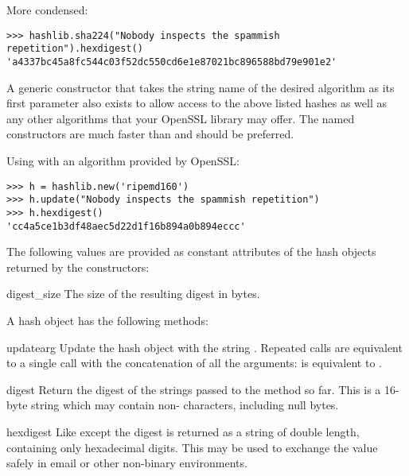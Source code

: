 More condensed:

\begin{verbatim}
>>> hashlib.sha224("Nobody inspects the spammish repetition").hexdigest()
'a4337bc45a8fc544c03f52dc550cd6e1e87021bc896588bd79e901e2'
\end{verbatim}

A generic  constructor that takes the string name of the
desired algorithm as its first parameter also exists to allow access to the
above listed hashes as well as any other algorithms that your OpenSSL library
may offer.  The named constructors are much faster than  and
should be preferred.

Using  with an algorithm provided by OpenSSL:

\begin{verbatim}
>>> h = hashlib.new('ripemd160')
>>> h.update("Nobody inspects the spammish repetition")
>>> h.hexdigest()
'cc4a5ce1b3df48aec5d22d1f16b894a0b894eccc'
\end{verbatim}

The following values are provided as constant attributes of the hash objects
returned by the constructors:

\begin{datadesc}{digest_size}
  The size of the resulting digest in bytes.
\end{datadesc}

A hash object has the following methods:

\begin{methoddesc}[hash]{update}{arg}
Update the hash object with the string .  Repeated calls are
equivalent to a single call with the concatenation of all the
arguments:  is equivalent to
.
\end{methoddesc}

\begin{methoddesc}[hash]{digest}{}
Return the digest of the strings passed to the 
method so far.  This is a 16-byte string which may contain
non-\ASCII{} characters, including null bytes.
\end{methoddesc}

\begin{methoddesc}[hash]{hexdigest}{}
Like  except the digest is returned as a string of
double length, containing only hexadecimal digits.  This may 
be used to exchange the value safely in email or other non-binary
environments.
\end{methoddesc}

